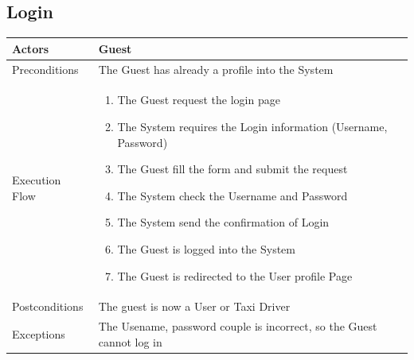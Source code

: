 \documentclass[english]{article}
\begin{document}
\subsection{Login}

\begin{tabular}{lp{8cm}}
\hline
Actors & Guest \\
\hline
Preconditions &   The Guest has already a profile into the System\\
\hline
Execution Flow &  
		\begin{enumerate}
			\item The Guest request the login page
			\item The System requires the Login information (Username, Password)
			\item The Guest fill the form and submit the request
			\item The System check the Username and Password
			\item The System send the confirmation of Login
			\item The Guest is logged into the System
			\item The Guest is redirected to the User profile Page
		\end{enumerate} 
	\\ 
\hline
Postconditions & The guest is now a User or Taxi Driver \\
\hline
Exceptions & The Usename, password couple is incorrect, so the Guest cannot log in
\end{tabular}
\end{document}
